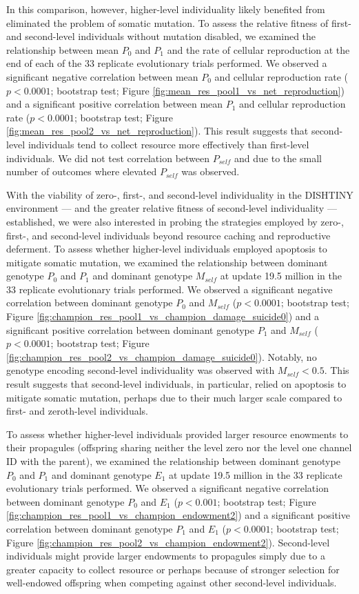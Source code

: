 In this comparison, however, higher-level individuality likely benefited from eliminated the problem of somatic mutation.
To assess the relative fitness of first- and second-level individuals without mutation disabled, we examined the relationship between mean $P_0$ and $P_1$ and the rate of cellular reproduction at the end of each of the 33 replicate evolutionary trials performed.
We observed a significant negative correlation between mean $P_0$ and cellular reproduction rate ($p < 0.0001$; bootstrap test; Figure \ref{fig:mean_res_pool1_vs_net_reproduction}) and a significant positive correlation between mean $P_1$ and cellular reproduction rate ($p < 0.0001$; bootstrap test; Figure \ref{fig:mean_res_pool2_vs_net_reproduction}).
This result suggests that second-level individuals tend to collect resource more effectively than first-level individuals.
We did not test correlation between $P_{self}$ and due to the small number of outcomes where elevated $P_{self}$ was observed.

With the viability of zero-, first-, and second-level individuality in the DISHTINY environment --- and the greater relative fitness of second-level individuality --- established, we were also interested in probing the strategies employed by zero-, first-, and second-level individuals beyond resource caching and reproductive deferment.
To assess whether higher-level individuals employed apoptosis to mitigate somatic mutation, we examined the relationship between dominant genotype $P_0$ and $P_1$ and dominant genotype $M_{self}$ at update 19.5 million in the 33 replicate evolutionary trials performed.
We observed a significant negative correlation between dominant genotype $P_0$ and $M_{self}$ ($p < 0.0001$; bootstrap test; Figure \ref{fig:champion_res_pool1_vs_champion_damage_suicide0}) and a significant positive correlation between dominant genotype $P_1$ and $M_{self}$ ($p < 0.0001$; bootstrap test; Figure \ref{fig:champion_res_pool2_vs_champion_damage_suicide0}).
Notably, no genotype encoding second-level individuality was observed with $M_{self} < 0.5$.
This result suggests that second-level individuals, in particular, relied on apoptosis to mitigate somatic mutation, perhaps due to their much larger scale compared to first- and zeroth-level individuals.

To assess whether higher-level individuals provided larger resource enowments to their propagules (offspring sharing neither the level zero nor the level one channel ID with the parent), we examined the relationship between dominant genotype $P_0$ and $P_1$ and dominant genotype $E_1$ at update 19.5 million in the 33 replicate evolutionary trials performed.
We observed a significant negative correlation between dominant genotype $P_0$ and $E_1$ ($p < 0.001$; bootstrap test; Figure \ref{fig:champion_res_pool1_vs_champion_endowment2}) and a significant positive correlation between dominant genotype $P_1$ and $E_1$ ($p <  0.0001$; bootstrap test; Figure \ref{fig:champion_res_pool2_vs_champion_endowment2}).
Second-level individuals might provide larger endowments to propagules simply due to a greater capacity to collect resource or perhaps because of stronger selection for well-endowed offspring when competing against other second-level individuals.

